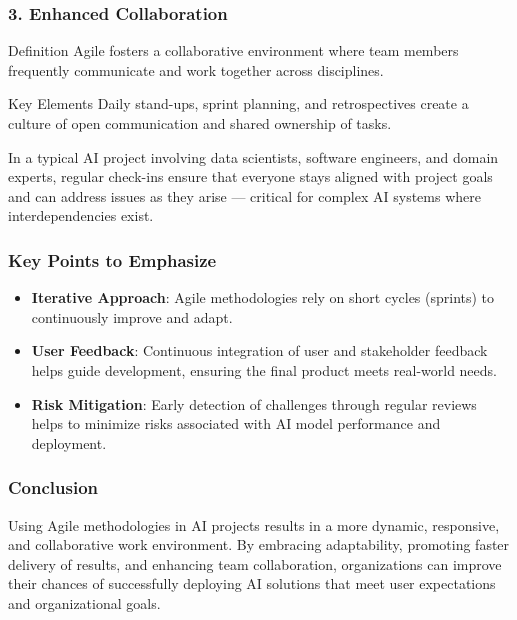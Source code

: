\documentclass{beamer}
\begin{document}
\begin{frame}[fragile]
    \frametitle{3. Enhanced Collaboration}
    \begin{block}{Definition}
        Agile fosters a collaborative environment where team members frequently communicate and work together across disciplines.
    \end{block}
    \begin{block}{Key Elements}
        Daily stand-ups, sprint planning, and retrospectives create a culture of open communication and shared ownership of tasks.
    \end{block}
    \begin{example}
        In a typical AI project involving data scientists, software engineers, and domain experts, regular check-ins ensure that everyone stays aligned with project goals and can address issues as they arise — critical for complex AI systems where interdependencies exist.
    \end{example}
\end{frame}

\begin{frame}[fragile]
    \frametitle{Key Points to Emphasize}
    \begin{itemize}
        \item \textbf{Iterative Approach}: Agile methodologies rely on short cycles (sprints) to continuously improve and adapt.
        \item \textbf{User Feedback}: Continuous integration of user and stakeholder feedback helps guide development, ensuring the final product meets real-world needs.
        \item \textbf{Risk Mitigation}: Early detection of challenges through regular reviews helps to minimize risks associated with AI model performance and deployment.
    \end{itemize}
\end{frame}

\begin{frame}[fragile]
    \frametitle{Conclusion}
    Using Agile methodologies in AI projects results in a more dynamic, responsive, and collaborative work environment. By embracing adaptability, promoting faster delivery of results, and enhancing team collaboration, organizations can improve their chances of successfully deploying AI solutions that meet user expectations and organizational goals.
\end{frame}
\end{document}
